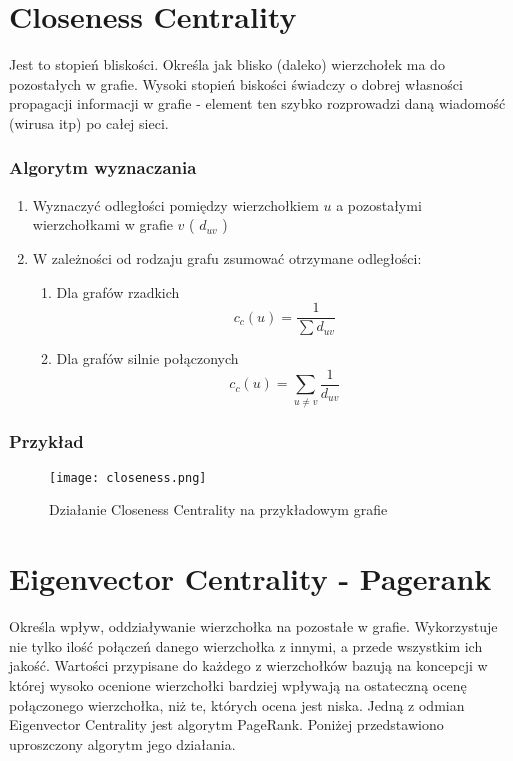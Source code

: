 \section{Closeness Centrality}

Jest to stopień bliskości. Określa jak blisko (daleko) wierzchołek ma do pozostałych w grafie. Wysoki stopień biskości świadczy o dobrej własności propagacji informacji w grafie - element ten szybko rozprowadzi daną wiadomość (wirusa itp) po całej sieci.


\subsubsection{Algorytm wyznaczania}
\begin{enumerate}
\item Wyznaczyć odległości pomiędzy wierzchołkiem $u$ a pozostałymi wierzchołkami w grafie $v$  ( $d_{uv}$ )
\item W zależności od rodzaju grafu zsumować otrzymane odległości:
\begin{enumerate}
\item Dla grafów rzadkich $$ c_c(u) = \frac{1}{\sum d_{uv} }$$
\item Dla grafów silnie połączonych $$ c_c(u) = \sum_{u \neq v} \frac{1}{d_{uv} }$$
\end{enumerate}
\end{enumerate}

\FloatBarrier
\subsubsection{Przykład}
\begin{figure}[h]
\centering
\texttt{[image: closeness.png]}
\caption{Działanie Closeness Centrality  na przykładowym grafie}
\end{figure}
\FloatBarrier

\section{Eigenvector Centrality - Pagerank}
Określa wpływ, oddziaływanie wierzchołka na pozostałe w grafie. Wykorzystuje nie tylko ilość połączeń danego wierzchołka z innymi, a przede wszystkim ich jakość. Wartości przypisane do każdego z wierzchołków bazują na koncepcji w której wysoko ocenione wierzchołki bardziej wpływają na ostateczną ocenę połączonego wierzchołka, niż te, których ocena jest niska. Jedną z odmian Eigenvector Centrality jest algorytm PageRank. Poniżej przedstawiono uproszczony algorytm jego działania.


